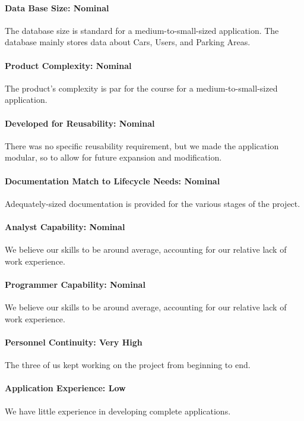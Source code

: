 \paragraph*{Data Base Size: Nominal}
The database size is standard for a medium-to-small-sized application. The database mainly stores data about Cars, Users, and Parking Areas.

\paragraph*{Product Complexity: Nominal}
The product's complexity is par for the course for a medium-to-small-sized application.

\paragraph*{Developed for Reusability: Nominal}
There was no specific reusability requirement, but we made the application modular, so to allow for future expansion and modification.

\paragraph*{Documentation Match to Lifecycle Needs: Nominal}
Adequately-sized documentation is provided for the various stages of the project.

\paragraph*{Analyst Capability: Nominal}
We believe our skills to be around average, accounting for our relative lack of work experience.

\paragraph*{Programmer Capability: Nominal}
We believe our skills to be around average, accounting for our relative lack of work experience.

\paragraph*{Personnel Continuity: Very High}
The three of us kept working on the project from beginning to end.

\paragraph*{Application Experience: Low}
We have little experience in developing complete applications.

